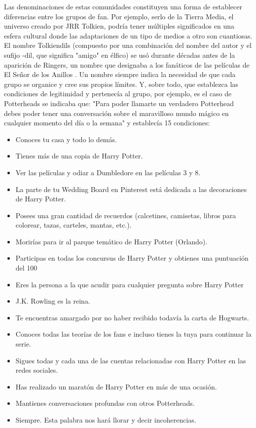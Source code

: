\documentclass[spanish]{textolivre}
\begin{document}
Las denominaciones de estas comunidades constituyen una forma de establecer diferencias entre los grupos de fan. Por ejemplo, serlo de la Tierra Media, el universo creado por JRR Tolkien, podría tener múltiples significados en una esfera cultural donde las adaptaciones de un tipo de medios a otro son cuantiosas. El nombre Tolkiendils (compuesto por una combinación del nombre del autor y el sufijo -dil, que significa "amigo" en élfico) se usó durante décadas antes de la aparición de Ringers, un nombre que designaba a los fanáticos de las películas de El Señor de los Anillos \cite{shefrin_lord_2004}. Un nombre siempre indica la necesidad de que cada grupo se organice y cree sus propios límites. Y, sobre todo, que establezca las condiciones de legitimidad y pertenecía al grupo, por ejemplo, es el caso de Potterheads se indicaba que: "Para poder llamarte un verdadero Potterhead debes poder tener una conversación sobre el maravilloso mundo mágico en cualquier momento del día o la semana" \cite{hubbell_what_2016} y establecía 15 condiciones:

\begin{itemize}
    \item Conoces tu casa y todo lo demás.
\item Tienes más de una copia de Harry Potter.
\item Ver las películas y odiar a Dumbledore en las películas 3 y 8.
\item La parte de tu Wedding Board en Pinterest está dedicada a las decoraciones de Harry Potter.
\item Posees una gran cantidad de recuerdos (calcetines, camisetas, libros para colorear, tazas, carteles, mantas, etc.).
\item Morirías para ir al parque temático de Harry Potter (Orlando).
\item Participas en todas los concursus de Harry Potter y obtienes una puntuación del 100%
\item Eres la persona a la que acudir para cualquier pregunta sobre Harry Potter
\item J.K. Rowling es la reina.
\item Te encuentras amargado por no haber recibido todavía la carta de Hogwarts.
\item Conoces todas las teorías de los fans e incluso tienes la tuya para continuar la serie.
\item Sigues todas y cada una de las cuentas relacionadas con Harry Potter en las redes sociales.
\item Has realizado un maratón de Harry Potter en más de una ocasión.
\item Mantienes conversaciones profundas con otros Potterheads.
\item Siempre. Esta palabra nos hará llorar y decir incoherencias.
\end{itemize}
\end{document}
